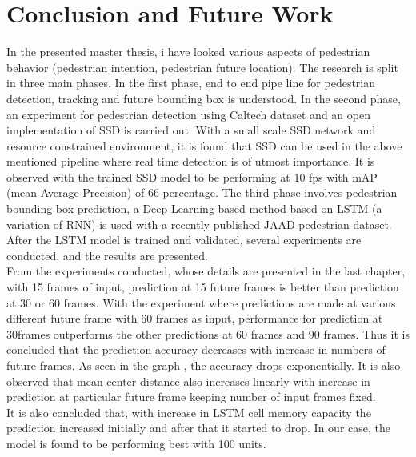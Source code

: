 
\chapter{Conclusion and Future Work}
In the presented master thesis, i have looked various aspects of pedestrian behavior (pedestrian intention, pedestrian future location). The research is split in three main phases. In the first phase, end to end pipe line for pedestrian detection, tracking and future bounding box is understood. In the second phase, an experiment for pedestrian detection using Caltech dataset and an open implementation of SSD is carried out. With a small scale SSD network and resource constrained environment, it is found that SSD can be used in the above mentioned pipeline where real time detection is of utmost importance. It is observed with the trained SSD model to be performing at 10  fps with mAP (mean Average Precision) of 66 percentage. The third phase involves pedestrian bounding box prediction, a Deep Learning  based method based on LSTM (a variation of RNN) is used with a recently published JAAD-pedestrian dataset. After the LSTM model is trained and validated, several experiments are conducted, and the results are presented. \\

From the experiments conducted, whose details are presented in the last chapter, with 15 frames of input, prediction at 15 future frames is better than prediction at 30 or 60 frames. With the experiment where predictions are made at various different future frame with 60 frames as input, performance for prediction at 30frames outperforms the other predictions at 60 frames and 90 frames. Thus it is concluded that the prediction accuracy decreases with increase in numbers of future frames. As seen in the graph , the accuracy drops exponentially. It is also observed that mean center distance also increases linearly with increase in prediction at particular future frame keeping number of input frames fixed. \\

It is also concluded that, with increase in LSTM cell memory capacity the prediction increased initially and after that it started to drop. In our case, the model is found to be performing best with 100 units. \\

